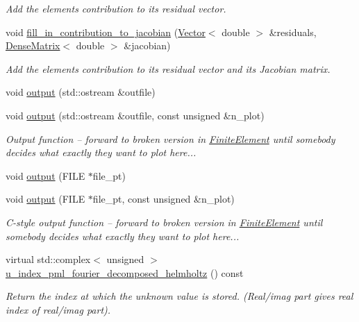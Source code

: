 \begin{DoxyCompactItemize}
\begin{DoxyCompactList}\small\item\em Add the element\textquotesingle{}s contribution to its residual vector. \end{DoxyCompactList}\item 
void \hyperlink{classoomph_1_1PMLFourierDecomposedHelmholtzFluxElement_aa24365f7454ab68b0c1b989cc34bd34b}{fill\+\_\+in\+\_\+contribution\+\_\+to\+\_\+jacobian} (\hyperlink{classoomph_1_1Vector}{Vector}$<$ double $>$ \&residuals, \hyperlink{classoomph_1_1DenseMatrix}{Dense\+Matrix}$<$ double $>$ \&jacobian)
\begin{DoxyCompactList}\small\item\em Add the element\textquotesingle{}s contribution to its residual vector and its Jacobian matrix. \end{DoxyCompactList}\item 
void \hyperlink{classoomph_1_1PMLFourierDecomposedHelmholtzFluxElement_a88de9165ecb2201d50cf5dc7c33f1ec3}{output} (std\+::ostream \&outfile)
\item 
void \hyperlink{classoomph_1_1PMLFourierDecomposedHelmholtzFluxElement_afc5b763269729cdd6a6080dfcca81c86}{output} (std\+::ostream \&outfile, const unsigned \&n\+\_\+plot)
\begin{DoxyCompactList}\small\item\em Output function -- forward to broken version in \hyperlink{classoomph_1_1FiniteElement}{Finite\+Element} until somebody decides what exactly they want to plot here... \end{DoxyCompactList}\item 
void \hyperlink{classoomph_1_1PMLFourierDecomposedHelmholtzFluxElement_a3c0bed2bf396c9ebf5d0379acd968546}{output} (F\+I\+LE $\ast$file\+\_\+pt)
\item 
void \hyperlink{classoomph_1_1PMLFourierDecomposedHelmholtzFluxElement_a0e6e5da60194eadcc9eaa50cabe0eafb}{output} (F\+I\+LE $\ast$file\+\_\+pt, const unsigned \&n\+\_\+plot)
\begin{DoxyCompactList}\small\item\em C-\/style output function -- forward to broken version in \hyperlink{classoomph_1_1FiniteElement}{Finite\+Element} until somebody decides what exactly they want to plot here... \end{DoxyCompactList}\item 
virtual std\+::complex$<$ unsigned $>$ \hyperlink{classoomph_1_1PMLFourierDecomposedHelmholtzFluxElement_a182637b5b3650432f2b80e4e64218b3f}{u\+\_\+index\+\_\+pml\+\_\+fourier\+\_\+decomposed\+\_\+helmholtz} () const
\begin{DoxyCompactList}\small\item\em Return the index at which the unknown value is stored. (Real/imag part gives real index of real/imag part). \end{DoxyCompactList}\end{DoxyCompactItemize}
